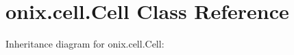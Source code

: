 \hypertarget{classonix_1_1cell_1_1Cell}{}\section{onix.\+cell.\+Cell Class Reference}
\label{classonix_1_1cell_1_1Cell}


Inheritance diagram for onix.\+cell.\+Cell\+:
